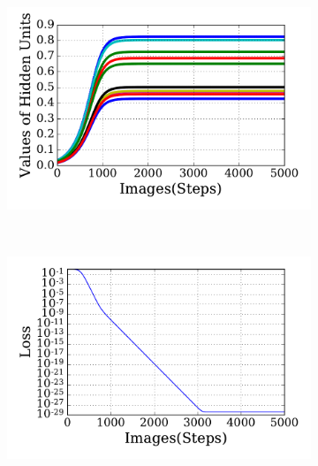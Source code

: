 \begin{figure}
\begin{subfigure}[t]{0.48\textwidth}
		\caption{}
	\end{subfigure}
	\begin{subfigure}[t]{0.48\textwidth}
		\includegraphics[width=\textwidth]{pics_sdlm/20_exp_AE/exp2_hid_non.pdf}
		\caption{}
	\end{subfigure}\\
	\begin{subfigure}[t]{0.48\textwidth}
		\includegraphics[width=\textwidth]{pics_sdlm/20_exp_AE/exp1_loss.pdf}
		\caption{}
	\end{subfigure}
	\begin{subfigure}[t]{0.48\textwidth}

\end{subfigure}
\end{figure}
